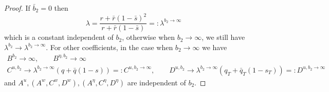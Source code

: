 \documentclass[11pt]{article}
\begin{document}
\begin{proof}
	If $\bar{b}_2 = 0$ then 
	$$\lambda = \frac{r + \bar{r}(1-\bar{s})^2}{r + \bar{r}(1-\bar{s})} =: \lambda^{b_2 \to \infty}$$ which is a constant independent of $b_2$,
	otherwise when $b_2 \to \infty$, we still have
	$ \lambda^{b_2} \to \lambda^{b_2 \to \infty}$.	
	For other coefficients, in the case when $b_2 \to \infty$ we have 
	\begin{equation*}
	\begin{array}{l}
	B^{b_2} \to \infty, \qquad B^{\eta,b_2} \to \infty\\
	C^{u,b_2} \to \lambda^{b_2 \to \infty} ( q + \bar{q}(1-s)) =: C^{u,b_2 \to \infty}, \qquad D^{u,b_2} \to \lambda^{b_2 \to \infty} (q_T + \bar{q}_T(1-s_T)) =: D^{u,b_2 \to \infty}
	\end{array}
	\end{equation*}
	and $A^{u}, (A^{w}, C^w, D^w), (A^{\eta}, C^{\eta}, D^{\eta})$ are independent of  $b_2$.
	

\end{proof}
\end{document}
